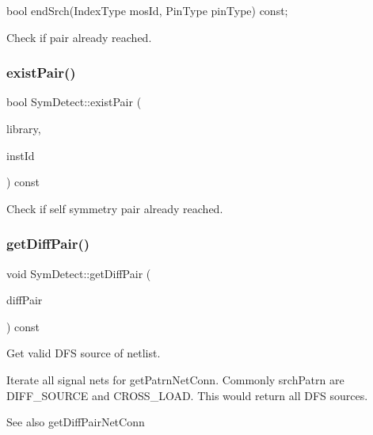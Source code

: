 bool end\+Srch(\+Index\+Type mos\+Id, Pin\+Type pin\+Type) const; 

Check if pair already reached. \mbox{\label{classSymDetect_a72b24ce0ad3992c207f5023250dd1d5a}} 
\subsubsection{\texorpdfstring{exist\+Pair()}{existPair()}\hspace{0.1cm}{\footnotesize\ttfamily [2/2]}}
{\footnotesize\ttfamily bool Sym\+Detect\+::exist\+Pair (\begin{DoxyParamCaption}\item[{std\+::vector$<$ \hyperlink{classMosPair}{Mos\+Pair} $>$ \&}]{library,  }\item[{\hyperlink{type_8h_a581e8093e28e7362f2b6937296190676}{Index\+Type}}]{inst\+Id }\end{DoxyParamCaption}) const\hspace{0.3cm}{\ttfamily [private]}}

Check if self symmetry pair already reached. \mbox{\label{classSymDetect_af04b93dac7e090cef8e741d8d1812485}} 
\subsubsection{\texorpdfstring{get\+Diff\+Pair()}{getDiffPair()}}
{\footnotesize\ttfamily void Sym\+Detect\+::get\+Diff\+Pair (\begin{DoxyParamCaption}\item[{std\+::vector$<$ \hyperlink{classMosPair}{Mos\+Pair} $>$ \&}]{diff\+Pair }\end{DoxyParamCaption}) const\hspace{0.3cm}{\ttfamily [private]}}



Get valid D\+FS source of netlist. 

Iterate all signal nets for get\+Patrn\+Net\+Conn. Commonly srch\+Patrn are D\+I\+F\+F\+\_\+\+S\+O\+U\+R\+CE and C\+R\+O\+S\+S\+\_\+\+L\+O\+AD. This would return all D\+FS sources.

\begin{DoxySeeAlso}{See also}
get\+Diff\+Pair\+Net\+Conn 
\end{DoxySeeAlso}

